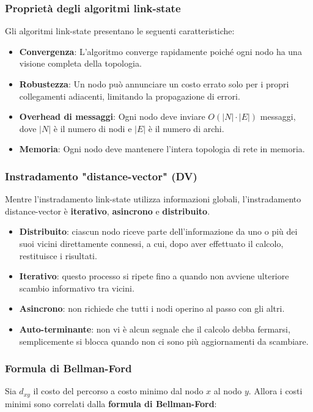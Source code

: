 \subsubsection*{Proprietà degli algoritmi link-state}
Gli algoritmi link-state presentano le seguenti caratteristiche:
\begin{itemize}
  \item \textbf{Convergenza}: L'algoritmo converge rapidamente poiché ogni nodo ha una visione completa della topologia.
  \item \textbf{Robustezza}: Un nodo può annunciare un costo errato solo per i propri collegamenti adiacenti, limitando la propagazione di errori.
  \item \textbf{Overhead di messaggi}: Ogni nodo deve inviare $O(|N| \cdot |E|)$ messaggi, dove $|N|$ è il numero di nodi e $|E|$ è il numero di archi.
  \item \textbf{Memoria}: Ogni nodo deve mantenere l'intera topologia di rete in memoria.
\end{itemize}

\subsubsection{Instradamento "distance-vector" (DV)}
Mentre l'instradamento link-state utilizza informazioni globali, l'instradamento distance-vector è \textbf{iterativo}, \textbf{asincrono} e \textbf{distribuito}.

\begin{itemize}
  \item \textbf{Distribuito}: ciascun nodo riceve parte dell'informazione da uno o più dei suoi vicini direttamente connessi, a cui, dopo aver effettuato il calcolo, restituisce i risultati.
  \item \textbf{Iterativo}: questo processo si ripete fino a quando non avviene ulteriore scambio informativo tra vicini.
  \item \textbf{Asincrono}: non richiede che tutti i nodi operino al passo con gli altri.
  \item \textbf{Auto-terminante}: non vi è alcun segnale che il calcolo debba fermarsi, semplicemente si blocca quando non ci sono più aggiornamenti da scambiare.
\end{itemize}

\subsubsection*{Formula di Bellman-Ford}
Sia $d_{xy}$ il costo del percorso a costo minimo dal nodo $x$ al nodo $y$. Allora i costi minimi sono correlati dalla \textbf{formula di Bellman-Ford}:

